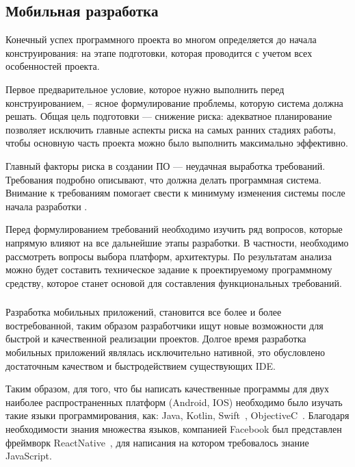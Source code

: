 \subsection{Мобильная разработка}
Конечный успех программного проекта во многом определяется до начала конструирования: на этапе подготовки, которая проводится с учетом всех особенностей проекта.

Первое предварительное условие, которое нужно выполнить перед конструированием, -- ясное формулирование проблемы, которую система должна решать. Общая цель подготовки — снижение риска: адекватное планирование позволяет исключить главные аспекты риска на самых ранних стадиях работы, чтобы основную часть проекта можно было выполнить максимально эффективно. 

Главный факторы риска в создании ПО — неудачная выработка требований. Требования подробно описывают, что должна делать программная система. Внимание к требованиям помогает свести к минимуму изменения системы после начала разработки \cite{code_complete}.

Перед формулированием требований необходимо изучить ряд вопросов, которые напрямую влияют на все дальнейшие этапы разработки. В частности, необходимо рассмотреть вопросы выбора платформ, архитектуры. По результатам анализа можно будет составить техническое задание к проектируемому программному средству, которое станет основой для составления функциональных требований.

\subsubsection{}
\label{sec:analysis:literature:platforms}

Разработка мобильных приложений, становится все более и более
востребованной, таким образом разработчики ищут новые возможности для
быстрой и качественной реализации проектов. Долгое время разработка
мобильных приложений являлась исключительно нативной, это обусловлено
достаточным качеством и быстродействием существующих IDE.

Таким образом, для того, что бы написать качественные программы для
двух наиболее распространенных платформ (Android, IOS) необходимо было
изучать такие языки программирования, как: Java, Kotlin, Swift~\cite{swift}, ObjectiveC~\cite{objectiveC}. Благодаря необходимости знания множества языков, компанией
Facebook был представлен фреймворк ReactNative~\cite{reactNaitve}, для написания на
котором требовалось знание JavaScript.

